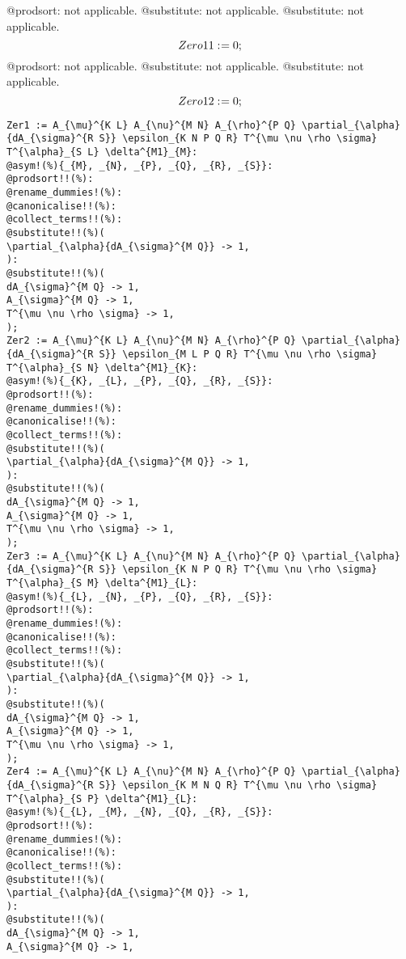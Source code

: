\documentclass[11pt]{article}
\def\specialcolon{\mathrel{\mathop{:}}\hspace{-.5em}}
\begin{document}
@prodsort: not applicable.
@substitute: not applicable.
@substitute: not applicable.
\begin{dmath*}[compact, spread=2pt]
Zero11\specialcolon{}= 0;
\end{dmath*}
@prodsort: not applicable.
@substitute: not applicable.
@substitute: not applicable.
\begin{dmath*}[compact, spread=2pt]
Zero12\specialcolon{}= 0;
\end{dmath*}
{\color[named]{Blue}\begin{verbatim}
Zer1 := A_{\mu}^{K L} A_{\nu}^{M N} A_{\rho}^{P Q} \partial_{\alpha}{dA_{\sigma}^{R S}} \epsilon_{K N P Q R} T^{\mu \nu \rho \sigma} T^{\alpha}_{S L} \delta^{M1}_{M}:
@asym!(%){_{M}, _{N}, _{P}, _{Q}, _{R}, _{S}}:
@prodsort!!(%):
@rename_dummies!(%):
@canonicalise!!(%):
@collect_terms!!(%):
@substitute!!(%)(
\partial_{\alpha}{dA_{\sigma}^{M Q}} -> 1,
):
@substitute!!(%)(
dA_{\sigma}^{M Q} -> 1,
A_{\sigma}^{M Q} -> 1,
T^{\mu \nu \rho \sigma} -> 1,
);
Zer2 := A_{\mu}^{K L} A_{\nu}^{M N} A_{\rho}^{P Q} \partial_{\alpha}{dA_{\sigma}^{R S}} \epsilon_{M L P Q R} T^{\mu \nu \rho \sigma} T^{\alpha}_{S N} \delta^{M1}_{K}:
@asym!(%){_{K}, _{L}, _{P}, _{Q}, _{R}, _{S}}:
@prodsort!!(%):
@rename_dummies!(%):
@canonicalise!!(%):
@collect_terms!!(%):
@substitute!!(%)(
\partial_{\alpha}{dA_{\sigma}^{M Q}} -> 1,
):
@substitute!!(%)(
dA_{\sigma}^{M Q} -> 1,
A_{\sigma}^{M Q} -> 1,
T^{\mu \nu \rho \sigma} -> 1,
);
Zer3 := A_{\mu}^{K L} A_{\nu}^{M N} A_{\rho}^{P Q} \partial_{\alpha}{dA_{\sigma}^{R S}} \epsilon_{K N P Q R} T^{\mu \nu \rho \sigma} T^{\alpha}_{S M} \delta^{M1}_{L}:
@asym!(%){_{L}, _{N}, _{P}, _{Q}, _{R}, _{S}}:
@prodsort!!(%):
@rename_dummies!(%):
@canonicalise!!(%):
@collect_terms!!(%):
@substitute!!(%)(
\partial_{\alpha}{dA_{\sigma}^{M Q}} -> 1,
):
@substitute!!(%)(
dA_{\sigma}^{M Q} -> 1,
A_{\sigma}^{M Q} -> 1,
T^{\mu \nu \rho \sigma} -> 1,
);
Zer4 := A_{\mu}^{K L} A_{\nu}^{M N} A_{\rho}^{P Q} \partial_{\alpha}{dA_{\sigma}^{R S}} \epsilon_{K M N Q R} T^{\mu \nu \rho \sigma} T^{\alpha}_{S P} \delta^{M1}_{L}:
@asym!(%){_{L}, _{M}, _{N}, _{Q}, _{R}, _{S}}:
@prodsort!!(%):
@rename_dummies!(%):
@canonicalise!!(%):
@collect_terms!!(%):
@substitute!!(%)(
\partial_{\alpha}{dA_{\sigma}^{M Q}} -> 1,
):
@substitute!!(%)(
dA_{\sigma}^{M Q} -> 1,
A_{\sigma}^{M Q} -> 1,

\end{verbatim}}
\end{document}
